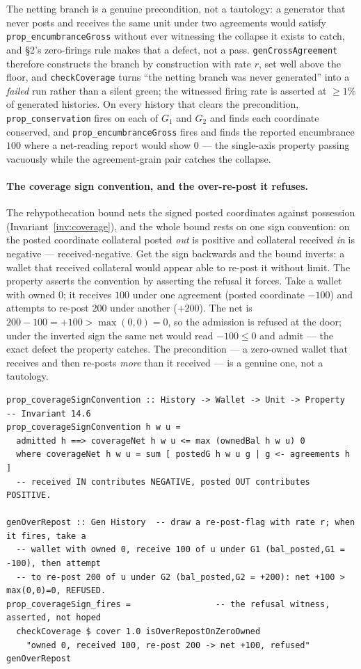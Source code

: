 The netting branch is a genuine precondition, not a tautology: a generator that never posts
and receives the same unit under two agreements would satisfy \texttt{prop\_encumbranceGross}
without ever witnessing the collapse it exists to catch, and \S 2's zero-firings rule makes
that a defect, not a pass. \texttt{genCrossAgreement} therefore constructs the branch by
construction with rate $r$, set well above the floor, and \texttt{checkCoverage} turns ``the
netting branch was never generated'' into a \emph{failed} run rather than a silent green; the
witnessed firing rate is asserted at $\ge 1\%$ of generated histories. On every history that
clears the precondition, \texttt{prop\_conservation} fires on each of $G_1$ and $G_2$ and
finds each coordinate conserved, and \texttt{prop\_encumbranceGross} fires and finds the
reported encumbrance $100$ where a net-reading report would show $0$ --- the single-axis
property passing vacuously while the agreement-grain pair catches the collapse.

\paragraph{The coverage sign convention, and the over-re-post it refuses.}
The rehypothecation bound nets the signed posted coordinates against possession
(Invariant~\ref{inv:coverage}), and the whole bound rests on one sign convention: on
the posted coordinate collateral posted \emph{out} is positive and collateral
received \emph{in} is negative --- received-negative. Get the sign backwards and the
bound inverts: a wallet that received collateral would appear able to re-post it
without limit. The property asserts the convention by asserting the refusal it
forces. Take a wallet with owned $0$; it receives $100$ under one agreement (posted
coordinate $-100$) and attempts to re-post $200$ under another ($+200$). The net is
$200-100=+100>\max(0,0)=0$, so the admission is refused at the door; under the
inverted sign the same net would read $-100\le 0$ and admit --- the exact defect the
property catches. The precondition --- a zero-owned wallet that receives and then
re-posts \emph{more} than it received --- is a genuine one, not a tautology.

\begin{lstlisting}
prop_coverageSignConvention :: History -> Wallet -> Unit -> Property  -- Invariant 14.6
prop_coverageSignConvention h w u =
  admitted h ==> coverageNet h w u <= max (ownedBal h w u) 0
  where coverageNet h w u = sum [ postedG h w u g | g <- agreements h ]
  -- received IN contributes NEGATIVE, posted OUT contributes POSITIVE.

genOverRepost :: Gen History  -- draw a re-post-flag with rate r; when it fires, take a
  -- wallet with owned 0, receive 100 of u under G1 (bal_posted,G1 = -100), then attempt
  -- to re-post 200 of u under G2 (bal_posted,G2 = +200): net +100 > max(0,0)=0, REFUSED.
prop_coverageSign_fires =                 -- the refusal witness, asserted, not hoped
  checkCoverage $ cover 1.0 isOverRepostOnZeroOwned
    "owned 0, received 100, re-post 200 -> net +100, refused" genOverRepost
\end{lstlisting}


